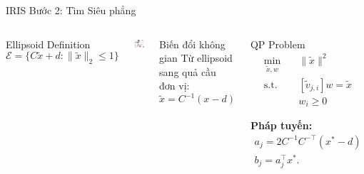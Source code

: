 \documentclass[aspectratio=169]{beamer}
\begin{document}
\begin{frame}{IRIS Bước 2: Tìm Siêu phẳng}
    \begin{columns}[c]
        \begin{block}{Ellipsoid Definition}
            \small
            \[
                \mathcal{E} = \{C\tilde{x} + d : \|\tilde{x}\|_2 \leq 1\}
            \]
        \end{block}
        \includegraphics[width=\textwidth]{../imgs/iris_algo_1.png}
        
        \begin{block}{Biến đổi không gian}
            \small
            Từ ellipsoid sang quả cầu đơn vị:
            \[
                \tilde{x} = C^{-1}(x - d)
            \]
        \end{block}

        \begin{block}{QP Problem}
            \small
            \[
                \begin{aligned}
                    \min_{\tilde{x}, w} \quad & \|\tilde{x}\|^2                \\
                    \text{s.t.} \quad         & [\tilde{v}_{j,i}]w = \tilde{x} \\
                                              & w_i \geq 0
                \end{aligned}
            \]

            \textbf{Pháp tuyến:}
            \[
                \begin{aligned}
                    a_j = 2C^{-1}C^{-\top}(x^* - d) \\
                    b_j = a_j^{\top}x^*.
                \end{aligned}
            \]
        \end{block}
    \end{columns}
\end{frame}
\end{document}
